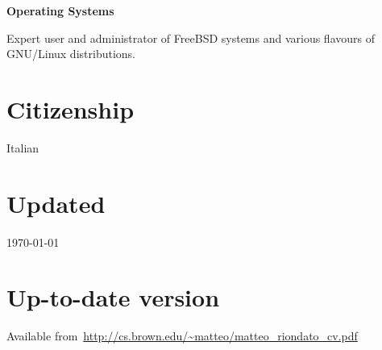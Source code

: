 \documentclass[margin,line]{resume}
\begin{document}
{\bf Operating Systems}
\begin{list2}
  \vspace*{.05in}
\item Expert user and administrator of FreeBSD systems and various flavours of GNU/Linux
  distributions.
\end{list2}

\section {\sc Citizenship}

Italian

\section{\sc Updated}
\today
\fi

\section{\sc Up-to-date version} Available from~\url{http://cs.brown.edu/~matteo/matteo\_riondato\_cv.pdf}
\end{document}
